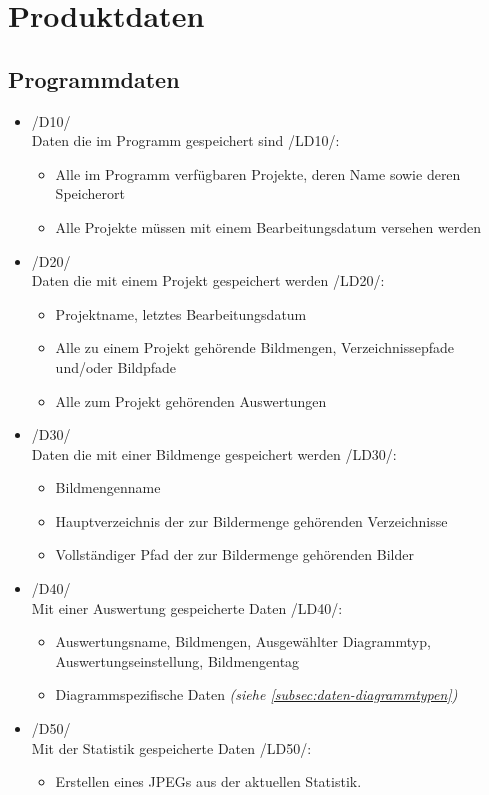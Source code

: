 \section{Produktdaten}

\subsection{Programmdaten}

\begin{itemize}
	\item /D10/\\Daten die im Programm gespeichert sind /LD10/:
	\begin{itemize} 
		\item Alle im Programm verfügbaren Projekte, deren Name sowie deren Speicherort
		\item Alle Projekte müssen mit einem Bearbeitungsdatum versehen werden
	\end{itemize}

	\item /D20/\\Daten die mit einem Projekt gespeichert werden /LD20/:
	\begin{itemize}
		\item Projektname, letztes Bearbeitungsdatum
		\item Alle zu einem Projekt gehörende Bildmengen, Verzeichnissepfade und/oder Bildpfade
		\item Alle zum Projekt gehörenden Auswertungen
	\end{itemize}

	\item /D30/\\Daten die mit einer Bildmenge gespeichert werden /LD30/:
	\begin{itemize}
		\item Bildmengenname
		\item Hauptverzeichnis der zur Bildermenge gehörenden Verzeichnisse
		\item Vollständiger Pfad der zur Bildermenge gehörenden Bilder
	\end{itemize}
	
	\item /D40/\\Mit einer Auswertung gespeicherte Daten /LD40/:
	\begin{itemize}
		\item Auswertungsname, Bildmengen, Ausgewählter Diagrammtyp, Auswertungseinstellung, Bildmengentag
		\item Diagrammspezifische Daten \itshape{(siehe \ref{subsec:daten-diagrammtypen})}
	\end{itemize}
		
	\item /D50/\\ Mit der Statistik gespeicherte Daten /LD50/:
	\begin{itemize}
		\item Erstellen eines JPEGs aus der aktuellen Statistik.
	\end{itemize}
\end{itemize}

